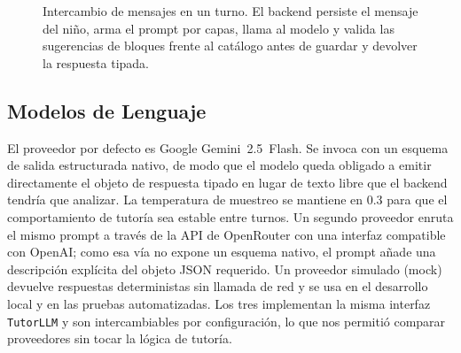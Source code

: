 \documentclass[conference]{IEEEtran}
\begin{document}
\begin{figure}[!t]
\centering
{}
\caption{Intercambio de mensajes en un turno. El backend persiste el mensaje del niño, arma el prompt por capas, llama al modelo y valida las sugerencias de bloques frente al catálogo antes de guardar y devolver la respuesta tipada.}
\label{fig:sequence}
\end{figure}

\subsection{Modelos de Lenguaje}
\label{sec:models}

El proveedor por defecto es Google Gemini~2.5~Flash. Se invoca con un esquema de salida estructurada nativo, de modo que el modelo queda obligado a emitir directamente el objeto de respuesta tipado en lugar de texto libre que el backend tendría que analizar. La temperatura de muestreo se mantiene en 0.3 para que el comportamiento de tutoría sea estable entre turnos. Un segundo proveedor enruta el mismo prompt a través de la API de OpenRouter con una interfaz compatible con OpenAI; como esa vía no expone un esquema nativo, el prompt añade una descripción explícita del objeto JSON requerido. Un proveedor simulado (mock) devuelve respuestas deterministas sin llamada de red y se usa en el desarrollo local y en las pruebas automatizadas. Los tres implementan la misma interfaz \texttt{TutorLLM} y son intercambiables por configuración, lo que nos permitió comparar proveedores sin tocar la lógica de tutoría.
\end{document}
